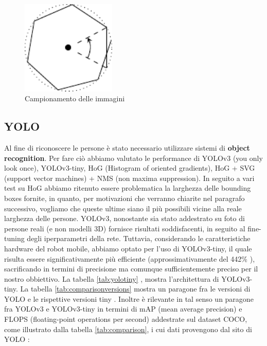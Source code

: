 \documentclass[a4paper]{article}
\begin{document}
	
	\begin{figure}[H]
		\centering
		\includegraphics[width=0.4\textwidth]{./img/pictures_sampling.pdf}
		\caption{Campionamento delle immagini}
		\label{fig:campionamento_immagini}
	\end{figure}
	
	\subsection{YOLO}\label{subsec:YOLO}
	Al fine di riconoscere le persone è stato necessario utilizzare sistemi di
	\textbf{object recognition}. Per fare ciò abbiamo valutato le performance di
	YOLOv3 (you only look once), YOLOv3-tiny, HoG (Histogram of oriented
	gradients), HoG + SVG (support vector machines) + NMS (non maxima
	suppression).  In seguito a vari test su HoG abbiamo ritenuto essere
	problematica la larghezza delle bounding boxes fornite, in quanto, per
	motivazioni che verranno chiarite nel paragrafo successivo, vogliamo che
	queste ultime siano il più possibili vicine alla reale larghezza delle
	persone. YOLOv3, nonostante sia stato addestrato su foto di persone reali
	(e non modelli 3D) fornisce risultati soddisfacenti, in seguito al
	fine-tuning degli iperparametri della rete. Tuttavia, considerando le
	caratteristiche hardware del robot mobile, abbiamo optato per l'uso di
	YOLOv3-tiny, il quale risulta essere significativamente più efficiente
	(approssimativamente del 442\% \cite{tiny_yolo}), sacrificando in termini
	di precisione ma comunque sufficientemente preciso per il nostro
	obbiettivo. La tabella \ref{tab:yolotiny} \cite{He2019TFYOLOAI}, mostra
	l'architettura di YOLOv3-tiny. La tabella \ref{tab:comparisonversions}
	mostra un paragone fra le versioni di YOLO e le rispettive versioni tiny
	\cite{tiny_yolo}. Inoltre è rilevante in tal senso un paragone fra YOLOv3 e
	YOLOv3-tiny in termini di mAP (mean average precision) e FLOPS
	(floating-point operations per second) addestrate sul dataset COCO, come
	illustrato dalla tabella \ref{tab:comparison}, i cui dati provengono dal
	sito di YOLO \cite{yolo}:
	
\end{document}
